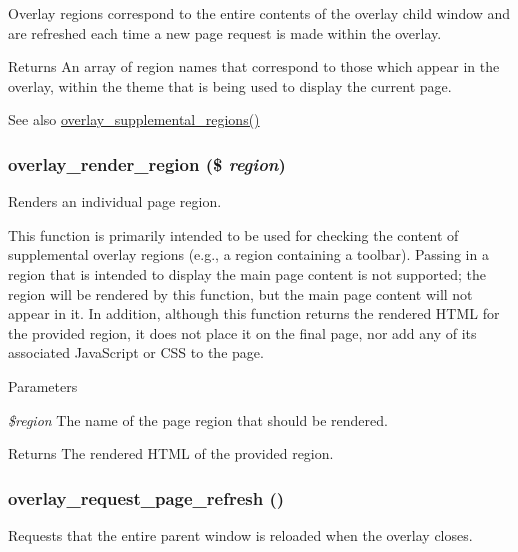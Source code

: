 Overlay regions correspond to the entire contents of the overlay child window and are refreshed each time a new page request is made within the overlay.

\begin{DoxyReturn}{Returns}
An array of region names that correspond to those which appear in the overlay, within the theme that is being used to display the current page.
\end{DoxyReturn}
\begin{DoxySeeAlso}{See also}
\hyperlink{overlay_8module_a450e5cee4c93de608b64aa7b3fc8cfe4}{overlay\_\-supplemental\_\-regions()} 
\end{DoxySeeAlso}
\hypertarget{overlay_8module_ad120052a1e2705ffb8b684e261875f21}{
\subsubsection[{overlay\_\-render\_\-region}]{\setlength{\rightskip}{0pt plus 5cm}overlay\_\-render\_\-region (\$ {\em region})}}
\label{overlay_8module_ad120052a1e2705ffb8b684e261875f21}
Renders an individual page region.

This function is primarily intended to be used for checking the content of supplemental overlay regions (e.g., a region containing a toolbar). Passing in a region that is intended to display the main page content is not supported; the region will be rendered by this function, but the main page content will not appear in it. In addition, although this function returns the rendered HTML for the provided region, it does not place it on the final page, nor add any of its associated JavaScript or CSS to the page.


\begin{DoxyParams}{Parameters}
\item[{\em \$region}]The name of the page region that should be rendered.\end{DoxyParams}
\begin{DoxyReturn}{Returns}
The rendered HTML of the provided region. 
\end{DoxyReturn}
\hypertarget{overlay_8module_a4b08054849bbe3885aa4d8bb7479012e}{
\subsubsection[{overlay\_\-request\_\-page\_\-refresh}]{\setlength{\rightskip}{0pt plus 5cm}overlay\_\-request\_\-page\_\-refresh ()}}
\label{overlay_8module_a4b08054849bbe3885aa4d8bb7479012e}
Requests that the entire parent window is reloaded when the overlay closes.

